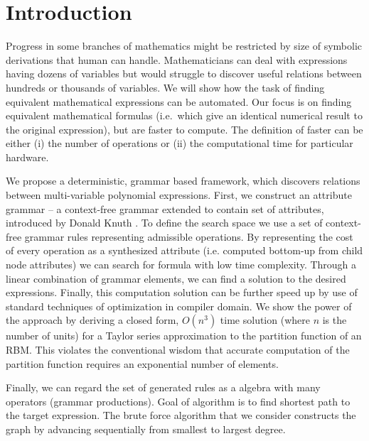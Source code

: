 \section{Introduction} \label{introduction} 

Progress in some branches of
mathematics might be restricted by size of symbolic derivations that human can
handle. Mathematicians can deal with expressions having dozens of
variables but would struggle to discover useful relations between hundreds or
thousands of variables. We will show how the task of finding equivalent
mathematical expressions can be automated. Our focus is on finding equivalent
mathematical formulas (i.e.~which give an identical numerical result
to the original expression),
but are faster to compute. The definition
of faster can be either (i) the number of operations or (ii) the computational time
for particular hardware.

We propose a deterministic, grammar based framework, which discovers
relations between multi-variable polynomial expressions. First, we
construct an attribute grammar -- a context-free grammar extended to
contain set of attributes, introduced by Donald Knuth
\cite{knuth1968semantics}. To define the search space we use a set of
context-free grammar rules representing admissible operations. By
representing the cost of every operation as a synthesized attribute
(i.e. computed bottom-up from child node attributes) we can search for
formula with low time complexity. Through a linear combination of
grammar elements, we can find a solution to the desired
expressions. Finally, this computation solution can be further speed
up by use of standard techniques of optimization in compiler
domain. We show the power of the approach by deriving a closed form,
$O(n^3)$ time solution (where $n$ is the number of units) for a Taylor
series approximation to the partition function of an RBM. This
violates the conventional wisdom that accurate computation of the
partition function requires an exponential number of elements.


Finally, we can regard the set of generated rules as a algebra with many operators 
(grammar productions). 
Goal of algorithm is to find shortest path to the target expression. 
The brute force algorithm that we consider
constructs the graph by advancing sequentially from smallest to largest degree.





